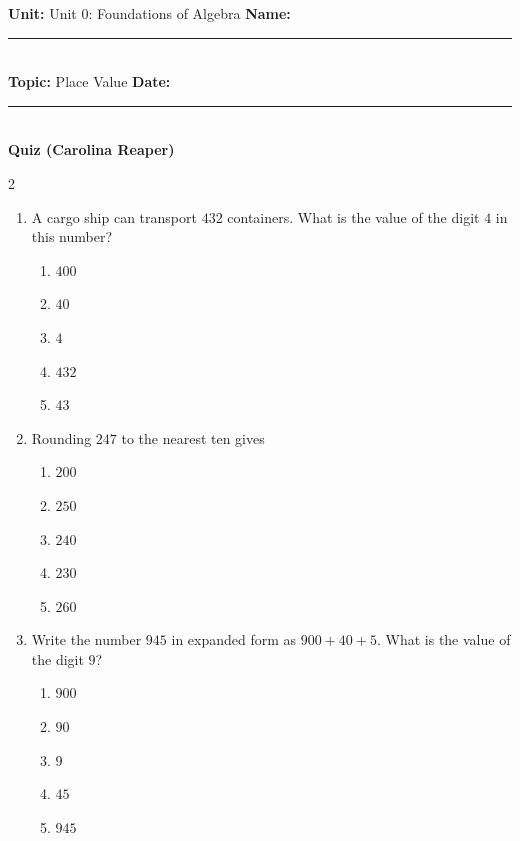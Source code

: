 \documentclass[10pt]{article}
\begin{document}
\enlargethispage{2.5cm}

\begin{tcolorbox}[colback=mainblue!5, colframe=mainblue, sharp corners, boxrule=0.5pt]
    \small \textbf{Unit:} Unit 0: Foundations of Algebra \hfill \textbf{Name:} \rule{3cm}{0.4pt} \\
    \small \textbf{Topic:} Place Value \hfill \textbf{Date:} \rule{2cm}{0.4pt} \\
    \centering \textbf{\large Quiz (Carolina Reaper)}
\end{tcolorbox}

\vspace{0.2cm}

\begin{multicols}{2}
\begin{enumerate}[label=\textbf{Q\arabic*.}, leftmargin=*, itemsep=6pt, parsep=0pt]

  \item \small A cargo ship can transport $432$ containers. What is the value of the digit $4$ in this number?
  \begin{enumerate}[label=(\Alph*), leftmargin=0.6cm, nosep, itemsep=2pt]
    \item $400$
    \item $40$
    \item $4$
    \item $432$
    \item $43$
  \end{enumerate}

  \item \small Rounding $247$ to the nearest ten gives
  \begin{enumerate}[label=(\Alph*), leftmargin=0.6cm, nosep, itemsep=2pt]
    \item $200$
    \item $250$
    \item $240$
    \item $230$
    \item $260$
  \end{enumerate}

  \item \small Write the number $945$ in expanded form as $900 + 40 + 5$. What is the value of the digit $9$?
  \begin{enumerate}[label=(\Alph*), leftmargin=0.6cm, nosep, itemsep=2pt]
    \item $900$
    \item $90$
    \item $9$
    \item $45$
    \item $945$
  \end{enumerate}


\end{enumerate}
\end{multicols}
\end{document}
